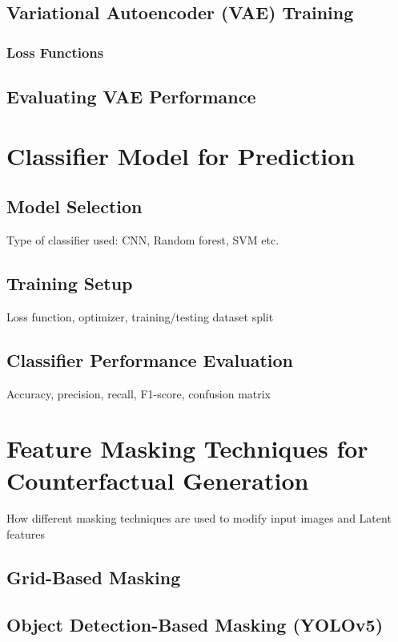 \subsection{Variational Autoencoder (VAE) Training}



\subsubsection{Loss Functions} \label{subsubsection: Loss Functions}

\subsection{Evaluating VAE Performance}


\section{Classifier Model for Prediction}

\subsection{Model Selection}
Type of classifier used: CNN, Random forest, SVM etc.

\subsection{Training Setup}
Loss function, optimizer, training/testing dataset split

\subsection{Classifier Performance Evaluation}
Accuracy, precision, recall, F1-score, confusion matrix


\section{Feature Masking Techniques for Counterfactual Generation}
How different masking techniques are used to modify input images and Latent features

\subsection{ Grid-Based Masking}

\subsection{Object Detection-Based Masking (YOLOv5)}

